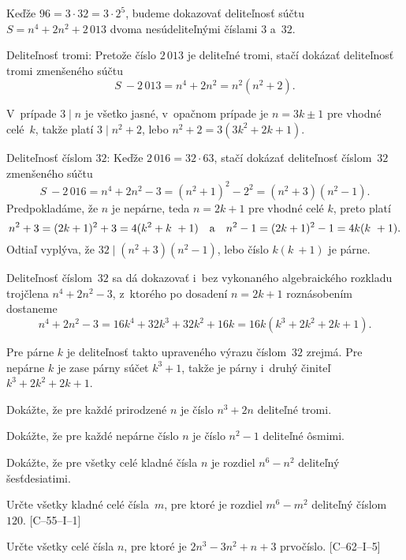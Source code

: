 {%
Keďže $96 = 3\cdot32 = 3\cdot2^5$, budeme dokazovať deliteľnosť súčtu
$S = n^4 + 2n^2 + 2\,013$ dvoma nesúdeliteľnými číslami $3$ a~$32$.

Deliteľnosť tromi: Pretože číslo $2\,013$ je deliteľné tromi, stačí dokázať
deliteľnosť tromi zmenšeného súčtu
$$
S~- 2\,013 = n^4 + 2n^2= n^2 (n^2 + 2).
$$

V~prípade $3\mid n$ je všetko jasné, v~opačnom prípade je $n = 3k\pm1$
pre vhodné celé~$k$, takže platí $3\mid n^2 + 2$, lebo $n^2 + 2 = 3(3k^2 + 2k + 1)$.

Deliteľnosť číslom $32$: Keďže $2\,016 = 32\cdot63$, stačí dokázať deliteľnosť
číslom~$32$ zmenšeného súčtu
$$
S~- 2\,016 = n^4 + 2n^2-3= (n^2 + 1)^2-2^2= (n^2 + 3)(n^2 - 1).
$$
Predpokladáme, že $n$ je nepárne, teda $n = 2k + 1$ pre vhodné celé $k$, preto platí
$$
n^2 + 3 = (2k + 1)^2 + 3 = 4(k^2 + k~+ 1)
\quad\hbox{a}\quad
n^2 - 1 = (2k + 1)^2 - 1 = 4k (k~+ 1).
$$
Odtiaľ vyplýva, že $32\mid (n^2 + 3)(n^2 - 1)$, lebo číslo $k (k~+ 1)$ je párne.

\poznamka
Deliteľnosť číslom~$32$ sa dá dokazovať i~bez vykonaného
algebraického rozkladu trojčlena $n^4 + 2n^2-3$, z~ktorého po dosadení $n = 2k + 1$
roznásobením dostaneme
$$
n^4 + 2n^2-3 = 16k^4 + 32k^3 + 32k^2 + 16k = 16k(k^3 + 2k^2 + 2k + 1).
$$

Pre párne $k$ je deliteľnosť takto upraveného výrazu číslom~$32$
zrejmá. Pre nepárne $k$ je zase párny súčet $k^3 + 1$, takže je párny i~druhý činiteľ
$k^3 + 2k^2 + 2k + 1$.

Dokážte, že pre každé prirodzené $n$ je číslo $n^3 + 2n$ deliteľné tromi.

Dokážte, že pre každé nepárne číslo $n$ je číslo $n^2 -1$ deliteľné ôsmimi.

Dokážte, že pre všetky celé kladné čísla $n$ je rozdiel $n^6 - n^2$ deliteľný šesťdesiatimi.

Určte všetky kladné celé čísla~$m$, pre ktoré je rozdiel $m^6 - m^2$ deliteľný číslom~$120$.
[C--55--I--1]

Určte všetky celé čísla $n$, pre ktoré je $2n^3 - 3n^2 + n + 3$ prvočíslo. [C--62--I--5]
}

